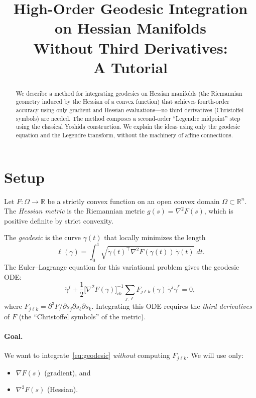 \documentclass[11pt]{article}
\title{High-Order Geodesic Integration on Hessian Manifolds\\
Without Third Derivatives:\\
A Tutorial}
\author{}
\date{}
\newcommand{\R}{\mathbb{R}}
\begin{document}
\maketitle

\begin{abstract}
We describe a method for integrating geodesics on Hessian manifolds
(the Riemannian geometry induced by the Hessian of a convex function)
that achieves fourth-order accuracy using only gradient and Hessian
evaluations---no third derivatives (Christoffel symbols) are needed.
The method composes a second-order ``Legendre midpoint'' step using
the classical Yoshida construction.  We explain the ideas using only
the geodesic equation and the Legendre transform, without the
machinery of affine connections.
\end{abstract}

\section{Setup}

Let $F : \Omega \to \R$ be a strictly convex function on an open
convex domain $\Omega \subset \R^n$.  The \emph{Hessian metric} is
the Riemannian metric $g(s) = \nabla^2 F(s)$, which is positive
definite by strict convexity.

The \emph{geodesic} is the curve $\gamma(t)$ that locally minimizes
the length
\[
  \ell(\gamma) = \int_0^1 \sqrt{\dot\gamma(t)^\top \nabla^2 F(\gamma(t)) \, \dot\gamma(t)} \; dt.
\]
The Euler--Lagrange equation for this variational problem gives the
geodesic ODE:
\begin{equation}\label{eq:geodesic}
  \ddot\gamma^i + \frac{1}{2} \bigl[\nabla^2 F(\gamma)\bigr]^{-1}_{ik}
  \sum_{j,\ell} F_{j\ell k}(\gamma) \, \dot\gamma^j \dot\gamma^\ell = 0,
\end{equation}
where $F_{j\ell k} = \partial^3 F / \partial s_j \partial s_\ell \partial s_k$.
Integrating this ODE requires the \emph{third derivatives} of $F$
(the ``Christoffel symbols'' of the metric).

\paragraph{Goal.}
We want to integrate~\eqref{eq:geodesic} \emph{without} computing
$F_{j\ell k}$.  We will use only:
\begin{itemize}
  \item $\nabla F(s)$ (gradient), and
  \item $\nabla^2 F(s)$ (Hessian).
\end{itemize}
\end{document}
